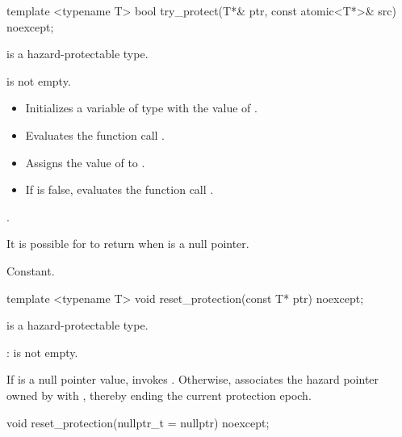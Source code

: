\begin{itemdecl}
template <typename T> bool try_protect(T*& ptr, const atomic<T*>& src) noexcept;
\end{itemdecl}

\begin{itemdescr}

\pnum
\mandates
{} is a hazard-protectable type.

\pnum
\expects
{} is not empty.

\pnum
\effects
\begin{itemize}
\item Initializes a variable  of type  with the value of .
\item Evaluates the function call .
\item Assigns the value of  to .
\item If  is false, evaluates the function call .
\end{itemize}

\pnum
\returns
{}. \begin{note} It is possible for  to return  when  is a null pointer. \end{note}

\pnum
\complexity
Constant.

\end{itemdescr}

\begin{itemdecl}
template <typename T> void reset_protection(const T* ptr) noexcept;
\end{itemdecl}

\begin{itemdescr}

\pnum
\mandates
{} is a hazard-protectable type.

\pnum
{}: 
 is not empty.

\pnum
\effects 
If  is a null pointer value, invokes . Otherwise, associates the hazard pointer owned by  with , thereby ending the current protection epoch.

\end{itemdescr}

\begin{itemdecl}
void reset_protection(nullptr_t = nullptr) noexcept;
\end{itemdecl}

